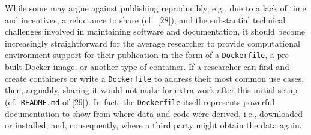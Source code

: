 \documentclass[10pt,letterpaper]{article}
\begin{document}
While some may argue against publishing reproducibly, e.g., due to a
lack of time and incentives, a reluctance to share (cf.~{[}28{]}), and
the substantial technical challenges involved in maintaining software
and documentation, it should become increasingly straightforward for the
average researcher to provide computational environment support for
their publication in the form of a \texttt{Dockerfile}, a pre-built
Docker image, or another type of container. If a researcher can find and
create containers or write a \texttt{Dockerfile} to address their most
common use cases, then, arguably, sharing it would not make for extra
work after this initial setup (cf.~\texttt{README.md} of {[}29{]}). In
fact, the \texttt{Dockerfile} itself represents powerful documentation
to show from where data and code were derived, i.e., downloaded or
installed, and, consequently, where a third party might obtain the data
again.

\clearpage

\scriptsize
\end{document}
